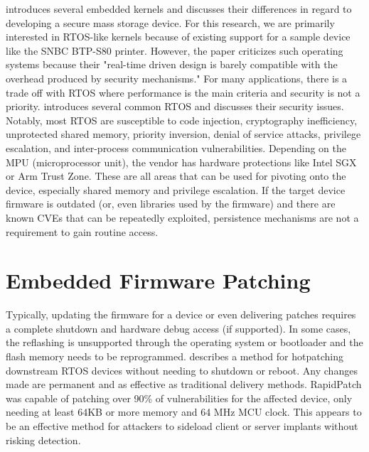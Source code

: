 
\autocite{Benadjila2018WooKeyU} introduces several embedded kernels and discusses their differences in regard to developing a secure mass storage device. For this research, we are primarily interested in RTOS-like kernels because of existing support for a sample device like the SNBC BTP-S80 printer. However, the paper criticizes such operating systems because their "real-time driven design is barely compatible with the overhead produced by security mechanisms." For many applications, there is a trade off with RTOS where performance is the main criteria and security is not a priority. \autocite{yuRealTimeOperatingSystem} introduces several common RTOS and discusses their security issues. Notably, most RTOS are susceptible to code injection, cryptography inefficiency, unprotected shared memory, priority inversion, denial of service attacks, privilege escalation, and inter-process communication vulnerabilities. Depending on the MPU (microprocessor unit), the vendor has hardware protections like Intel SGX or Arm Trust Zone. These are all areas that can be used for pivoting onto the device, especially shared memory and privilege escalation. If the target device firmware is outdated (or, even libraries used by the firmware) and there are known CVEs that can be repeatedly exploited, persistence mechanisms are not a requirement to gain routine access.

\section{Embedded Firmware Patching} \label{embeddedfirmwarepatching}


Typically, updating the firmware for a device or even delivering patches requires a complete shutdown and hardware debug access (if supported). In some cases, the reflashing is unsupported through the operating system or bootloader and the flash memory needs to be reprogrammed. \autocite{heRapidPatchFirmwareHotpatching2022} describes a method for hotpatching downstream RTOS devices without needing to shutdown or reboot. Any changes made are permanent and as effective as traditional delivery methods. RapidPatch was capable of patching over 90\% of vulnerabilities for the affected device, only needing at least 64KB or more memory and 64 MHz MCU clock. This appears to be an effective method for attackers to sideload client or server implants without risking detection. 

